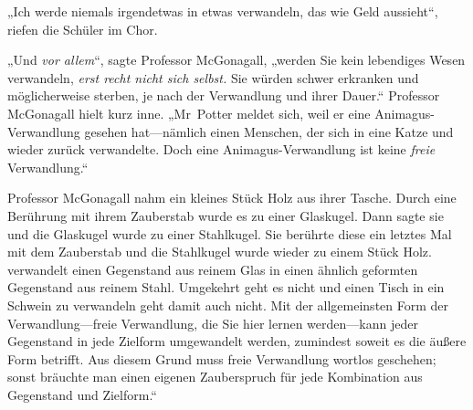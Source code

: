 „Ich werde niemals irgendetwas in etwas verwandeln, das wie Geld aussieht“, riefen die Schüler im Chor.

„Und \emph{vor allem}“, sagte Professor McGonagall, „werden Sie kein lebendiges Wesen verwandeln, \emph{erst recht nicht sich selbst.} Sie würden schwer erkranken und möglicherweise sterben, je nach der Verwandlung und ihrer Dauer.“ Professor McGonagall hielt kurz inne. „Mr~Potter meldet sich, weil er eine Animagus-Verwandlung gesehen hat—nämlich einen Menschen, der sich in eine Katze und wieder zurück verwandelte. Doch eine Animagus-Verwandlung ist keine \emph{freie} Verwandlung.“

Professor McGonagall nahm ein kleines Stück Holz aus ihrer Tasche. Durch eine Berührung mit ihrem Zauberstab wurde es zu einer Glaskugel. Dann sagte sie  und die Glaskugel wurde zu einer Stahlkugel. Sie berührte diese ein letztes Mal mit dem Zauberstab und die Stahlkugel wurde wieder zu einem Stück Holz.  verwandelt einen Gegenstand aus reinem Glas in einen ähnlich geformten Gegenstand aus reinem Stahl. Umgekehrt geht es nicht und einen Tisch in ein Schwein zu verwandeln geht damit auch nicht. Mit der allgemeinsten Form der Verwandlung—freie Verwandlung, die Sie hier lernen werden—kann jeder Gegenstand in jede Zielform umgewandelt werden, zumindest soweit es die äußere Form betrifft. Aus diesem Grund muss freie Verwandlung wortlos geschehen; sonst bräuchte man einen eigenen Zauberspruch für jede Kombination aus Gegenstand und Zielform.“

